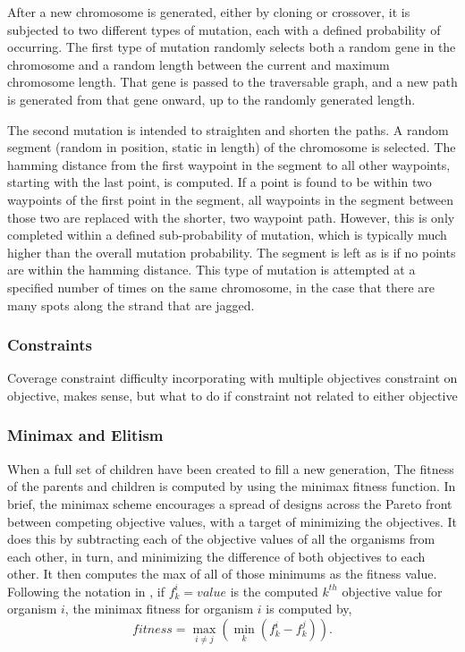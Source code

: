 \documentclass[letterpaper, 10 pt, conference]{ieeeconf}  %
\begin{document}
After a new chromosome is generated, either by cloning or crossover, it is subjected to two different types of mutation, each with a defined probability of occurring. The first type of mutation randomly selects both a random gene in the chromosome and a random length between the current and maximum chromosome length. That gene is passed to the traversable graph, and a new path is generated from that gene onward, up to the randomly generated length.

The second mutation is intended to straighten and shorten the paths. A random segment (random in position, static in length) of the chromosome is selected. The hamming distance from the first waypoint in the segment to all other waypoints, starting with the last point, is computed. If a point is found to be within two waypoints of the first point in the segment, all waypoints in the segment between those two are replaced with the shorter, two waypoint path. However, this is only completed within a defined sub-probability of mutation, which is typically much higher than the overall mutation probability. The segment is left as is if no points are within the hamming distance. This type of mutation is attempted at a specified number of times on the same chromosome, in the case that there are many spots along the strand that are jagged.

\subsubsection{Constraints}

Coverage constraint
difficulty incorporating with multiple objectives
constraint on objective, makes sense, but what to do if constraint not related to either objective

\subsubsection{Minimax and Elitism}
When a full set of children have been created to fill a new generation, The fitness of the parents and children is computed by using the minimax fitness function. In brief, the minimax scheme encourages a spread of designs across the Pareto front between competing objective values, with a target of minimizing the objectives. It does this by subtracting each of the objective values of all the organisms from each other, in turn, and minimizing the difference of both objectives to each other. It then computes the max of all of those minimums as the fitness value. Following the notation in \cite{Parkinson2019}, if $f_k^i = value$ is the computed $k^{th}$ objective value for organism $i$, the minimax fitness for organism $i$ is computed by,
\begin{equation}%
    fitness = \max_{i \neq j}\left(\min_{k}\left(f_k^i - f_k^j\right)\right).
\end{equation}
\end{document}
